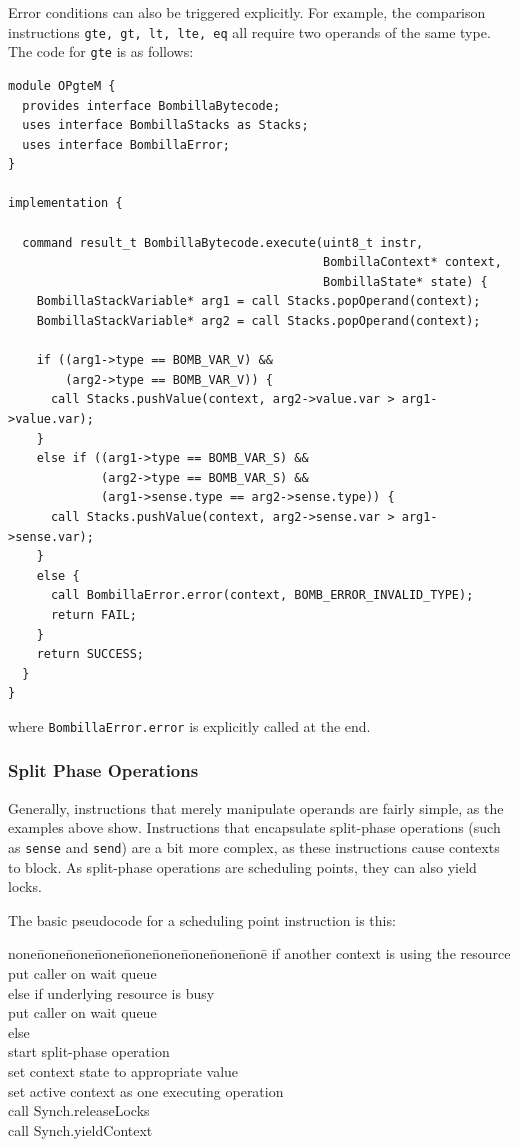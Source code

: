 \documentclass[10pt]{article}
\begin{document}
Error conditions can also be triggered explicitly. For example, the
comparison instructions {\tt gte, gt, lt, lte, eq} all require two
operands of the same type. The code for {\tt gte} is as follows:

\begin{verbatim}
module OPgteM {
  provides interface BombillaBytecode;
  uses interface BombillaStacks as Stacks;
  uses interface BombillaError;
}

implementation {

  command result_t BombillaBytecode.execute(uint8_t instr,
                                            BombillaContext* context,
                                            BombillaState* state) {
    BombillaStackVariable* arg1 = call Stacks.popOperand(context);
    BombillaStackVariable* arg2 = call Stacks.popOperand(context);
    
    if ((arg1->type == BOMB_VAR_V) &&
        (arg2->type == BOMB_VAR_V)) {
      call Stacks.pushValue(context, arg2->value.var > arg1->value.var);
    }
    else if ((arg1->type == BOMB_VAR_S) &&
             (arg2->type == BOMB_VAR_S) &&
             (arg1->sense.type == arg2->sense.type)) {
      call Stacks.pushValue(context, arg2->sense.var > arg1->sense.var);
    }
    else {
      call BombillaError.error(context, BOMB_ERROR_INVALID_TYPE);
      return FAIL;
    }
    return SUCCESS;
  }
}
\end{verbatim}

where {\tt BombillaError.error} is explicitly called at the end.

\subsubsection{Split Phase Operations}

Generally, instructions that merely manipulate operands are fairly
simple, as the examples above show. Instructions that encapsulate
split-phase operations (such as {\tt sense} and {\tt send}) are a bit
more complex, as these instructions cause contexts to block. As
split-phase operations are scheduling points, they can also yield
locks.

The basic pseudocode for a scheduling point instruction is this:

\begin{tabbing}
none\=none\=none\=none\=none\=none\=none\=none\=none\= \kill
if another context is using the resource \\
\>put caller on wait queue\\
else if underlying resource is busy \\
\>put caller on wait queue \\
else  \\
\>start split-phase operation \\
\>set context state to appropriate value\\
\>set active context as one executing operation\\
\>call Synch.releaseLocks \\
\>call Synch.yieldContext \\
\end{tabbing}
\end{document}
